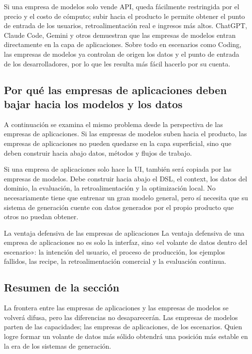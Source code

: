 Si una empresa de modelos solo vende API, queda fácilmente restringida por el precio y el costo de cómputo; subir hacia el producto le permite obtener el punto de entrada de los usuarios, retroalimentación real e ingresos más altos. ChatGPT, Claude Code, Gemini y otros demuestran que las empresas de modelos entran directamente en la capa de aplicaciones. Sobre todo en escenarios como Coding, las empresas de modelos ya controlan de origen los datos y el punto de entrada de los desarrolladores, por lo que les resulta más fácil hacerlo por su cuenta.

\subsection{Por qué las empresas de aplicaciones deben bajar hacia los modelos y los datos}

A continuación se examina el mismo problema desde la perspectiva de las empresas de aplicaciones. Si las empresas de modelos suben hacia el producto, las empresas de aplicaciones no pueden quedarse en la capa superficial, sino que deben construir hacia abajo datos, métodos y flujos de trabajo.

Si una empresa de aplicaciones solo hace la UI, también será copiada por las empresas de modelos. Debe construir hacia abajo el DSL, el context, los datos del dominio, la evaluación, la retroalimentación y la optimización local. No necesariamente tiene que entrenar un gran modelo general, pero sí necesita que su sistema de generación cuente con datos generados por el propio producto que otros no puedan obtener.

\begin{importantbox}{La ventaja defensiva de las empresas de aplicaciones}
La ventaja defensiva de una empresa de aplicaciones no es solo la interfaz, sino «el volante de datos dentro del escenario»: la intención del usuario, el proceso de producción, los ejemplos fallidos, las recipe, la retroalimentación comercial y la evaluación continua.
\end{importantbox}

\subsection{Resumen de la sección}

La frontera entre las empresas de aplicaciones y las empresas de modelos se volverá difusa, pero las diferencias no desaparecerán. Las empresas de modelos parten de las capacidades; las empresas de aplicaciones, de los escenarios. Quien logre formar un volante de datos más sólido obtendrá una posición más estable en la era de los sistemas de generación.
